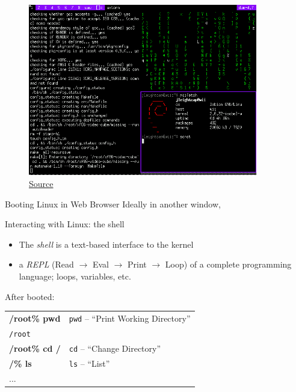 \documentclass{beamer} \usetheme{Madrid}
\begin{document}
\begin{frame}
    \begin{figure}
        \includegraphics[width=10cm]{wiilinux.png}
        \caption{\href{http://www.gc-linux.org/wiki/WL:whiite-linux}{Source}}
    \end{figure}
\end{frame}

\begin{frame}{Booting Linux in Web Browser}
    \vfill
        Ideally in another window,
    \vfill
\end{frame}

\begin{frame}{Interacting with Linux: the shell}
    \begin{itemize}
        \item The \emph{shell} is a text-based interface to the kernel
        \item a \emph{REPL} (Read $\rightarrow$ Eval $\rightarrow$ Print $\rightarrow$ Loop) of a complete programming language; loops, variables, etc.
    \end{itemize}
    \vspace{7mm}
    After booted:\\[5mm]
    \begin{tabular}{ll}
        \textbf{/root\% pwd} \hspace{15mm} & \texttt{pwd} -- ``Print Working Directory''\\
        \texttt{/root} \\
        \textbf{/root\% cd /} & \texttt{cd} -- ``Change Directory''\\
        \textbf{/\% ls} & \texttt{ls} -- ``List'' \\
        ...
    \end{tabular}
\end{frame}
\end{document}
